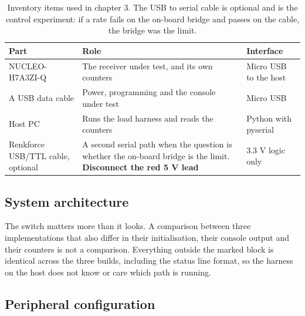 \begin{table}[H]\centering\small
\begin{tabular}{p{40mm}p{66mm}p{40mm}}
\toprule
Part & Role & Interface \\
\midrule
NUCLEO-H7A3ZI-Q & The receiver under test, and its own counters & Micro USB to the host \\
A USB data cable & Power, programming and the console under test & Micro USB \\
Host PC & Runs the load harness and reads the counters & Python with pyserial \\
Renkforce USB/TTL cable, optional & A second serial path when the question is whether the on-board bridge is the limit. \textbf{Disconnect the red 5 V lead} & 3.3 V logic only \\
\bottomrule
\end{tabular}
\caption{Inventory items used in chapter 3. The USB to serial cable is optional and is the control experiment: if a rate fails on the on-board bridge and passes on the cable, the bridge was the limit.}
\end{table}

\subsection*{System architecture}


The switch matters more than it looks. A comparison between three
implementations that also differ in their initialisation, their console output
and their counters is not a comparison. Everything outside the marked block is
identical across the three builds, including the status line format, so the
harness on the host does not know or care which path is running.

\subsection*{Peripheral configuration}


